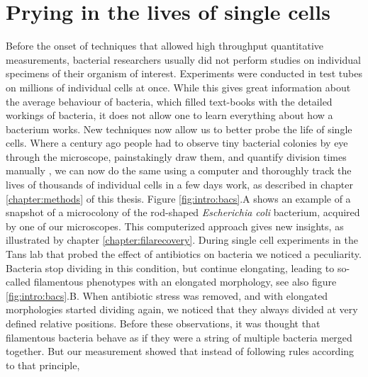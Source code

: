 \section{Prying in the lives of single cells}

%
%
Before the onset of techniques that allowed high throughput quantitative measurements, bacterial researchers usually did not perform studies on individual specimens of their organism of interest.
%
Experiments 
were conducted in test tubes on millions of individual cells at once.
%
While this gives great information about the average behaviour of bacteria, 
which filled text-books with the detailed workings of bacteria,
it does not allow one to learn everything about how a bacterium works.
%
%
New techniques now allow us to better probe the life of single cells.
%
Where a century ago people had to observe tiny bacterial colonies by eye through the microscope, painstakingly draw them, and quantify division times manually \cite{Kelly1932},
we can now do the same using a computer and 
thoroughly track the lives of thousands of individual cells in a few days work, as described in chapter \ref{chapter:methods} of this thesis.
%
Figure \ref{fig:intro:bacs}.A shows an example of a snapshot of a microcolony of the rod-shaped \textit{Escherichia coli} bacterium, acquired by one of our microscopes.
%
This computerized approach gives new insights, as illustrated by chapter \ref{chapter:filarecovery}.
%
During single cell experiments in the Tans lab that probed the effect of antibiotics on \ecoli bacteria \cite{RozendaalVerslagXXX} we noticed a peculiarity.
%
Bacteria stop dividing in this condition, but continue elongating, leading to so-called filamentous phenotypes with an elongated morphology, see also figure \ref{fig:intro:bacs}.B.
%
When antibiotic stress was removed, and \ecoli with elongated morphologies started dividing again, 
we noticed that 
they always divided at very defined relative positions.
%
Before these observations, it was thought that filamentous bacteria behave as if they were a string of multiple bacteria merged together.
%
But our measurement showed that instead of following rules according to that principle, 
